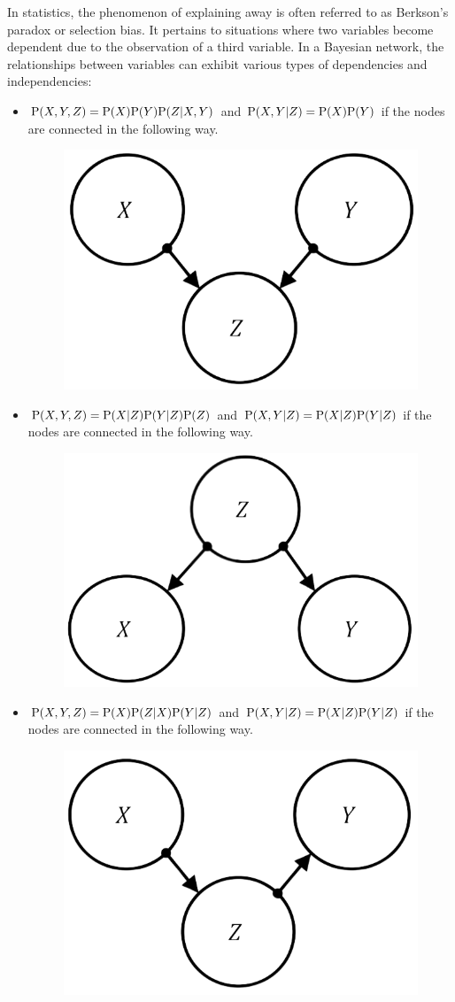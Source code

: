 \documentclass[12pt, a4paper]{report}
\begin{document}
    In statistics, the phenomenon of explaining away is often referred to as Berkson's paradox or selection bias. It pertains to situations where two variables become dependent due to the observation of a third variable. 
    In a Bayesian network, the relationships between variables can exhibit various types of dependencies and independencies: 
    \begin{itemize}
        \item $\textnormal{P}(X,Y,Z)=\textnormal{P}(X)\textnormal{P}(Y)\textnormal{P}(Z|X,Y)$ and $\textnormal{P}(X,Y|Z)=\textnormal{P}(X)\textnormal{P}(Y)$ if the nodes are connected in the following way. 
            \begin{figure}[H]
                \centering
                \includegraphics[width=0.2\linewidth]{images/independencies1.png}
            \end{figure}
        \item $\textnormal{P}(X,Y,Z)=\textnormal{P}(X|Z)\textnormal{P}(Y|Z)\textnormal{P}(Z)$ and $\textnormal{P}(X,Y|Z)=\textnormal{P}(X|Z)\textnormal{P}(Y|Z)$ if the nodes are connected in the following way. 
            \begin{figure}[H]
                \centering
                \includegraphics[width=0.2\linewidth]{images/independencies2.png}
            \end{figure}
        \item $\textnormal{P}(X,Y,Z)=\textnormal{P}(X)\textnormal{P}(Z|X)\textnormal{P}(Y|Z)$ and $\textnormal{P}(X,Y|Z)=\textnormal{P}(X|Z)\textnormal{P}(Y|Z)$ if the nodes are connected in the following way. 
            \begin{figure}[H]
                \centering
                \includegraphics[width=0.2\linewidth]{images/independencies3.png}
            \end{figure}
    \end{itemize}
\end{document}
